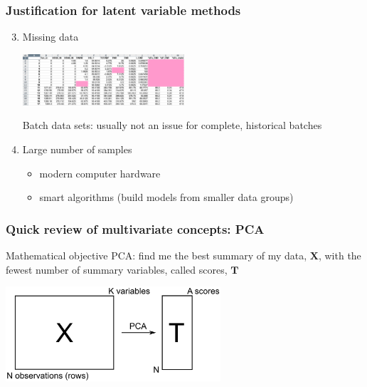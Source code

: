 \documentclass[handout, 12pt]{beamer}
\begin{document}
\begin{frame}\frametitle{Justification for latent variable methods}

\begin{enumerate}
	\setcounter{enumi}{2}
	\item	Missing data
	
			\begin{center}
				\includegraphics[width=6cm]{images/missing-data.png}
			\end{center}
			
			Batch data sets: usually not an issue for complete, historical batches			
			
	
	\item	Large number of samples
	
			\begin{itemize}
				\item	modern computer hardware
				
				\item	smart algorithms (build models from smaller data groups)
			\end{itemize} 
\end{enumerate}
\end{frame}

\begin{frame}\frametitle{Quick review of multivariate concepts: PCA}

	\begin{block}{Mathematical objective}
		PCA: find me the best summary of my data, \( \mathbf{X} \), with the fewest number of summary variables, called scores, \( \mathbf{T} \)
	\end{block}
	
	
	\begin{center}
		\includegraphics[width=8cm]{images/reduce-data-X-to-scores-T.png}
	\end{center}
	
	
\end{frame}
\end{document}
